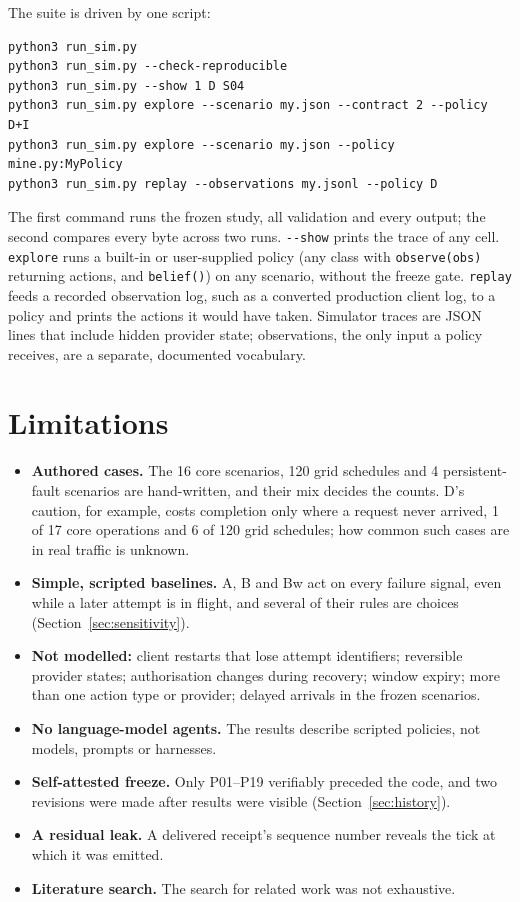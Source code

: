 \documentclass[11pt]{article}
\newcommand{\code}[1]{\texttt{#1}}
\begin{document}
The suite is driven by one script:
{\small
\begin{verbatim}
python3 run_sim.py
python3 run_sim.py --check-reproducible
python3 run_sim.py --show 1 D S04
python3 run_sim.py explore --scenario my.json --contract 2 --policy D+I
python3 run_sim.py explore --scenario my.json --policy mine.py:MyPolicy
python3 run_sim.py replay --observations my.jsonl --policy D
\end{verbatim}
}
\noindent The first command runs the frozen study, all validation and every output; the second compares every byte across two runs. \code{-{}-show} prints the trace of any cell. \code{explore} runs a built-in or user-supplied policy (any class with \code{observe(obs)} returning actions, and \code{belief()}) on any scenario, without the freeze gate. \code{replay} feeds a recorded observation log, such as a converted production client log, to a policy and prints the actions it would have taken. Simulator traces are JSON lines that include hidden provider state; observations, the only input a policy receives, are a separate, documented vocabulary.

\section{Limitations}\label{sec:limitations}

\begin{itemize}
  \item \textbf{Authored cases.} The 16 core scenarios, 120 grid schedules and 4 persistent-fault scenarios are hand-written, and their mix decides the counts. D's caution, for example, costs completion only where a request never arrived, 1 of 17 core operations and 6 of 120 grid schedules; how common such cases are in real traffic is unknown.
  \item \textbf{Simple, scripted baselines.} A, B and Bw act on every failure signal, even while a later attempt is in flight, and several of their rules are choices (Section~\ref{sec:sensitivity}).
  \item \textbf{Not modelled:} client restarts that lose attempt identifiers; reversible provider states; authorisation changes during recovery; window expiry; more than one action type or provider; delayed arrivals in the frozen scenarios.
  \item \textbf{No language-model agents.} The results describe scripted policies, not models, prompts or harnesses.
  \item \textbf{Self-attested freeze.} Only P01--P19 verifiably preceded the code, and two revisions were made after results were visible (Section~\ref{sec:history}).
  \item \textbf{A residual leak.} A delivered receipt's sequence number reveals the tick at which it was emitted.
  \item \textbf{Literature search.} The search for related work was not exhaustive.
\end{itemize}
\end{document}
